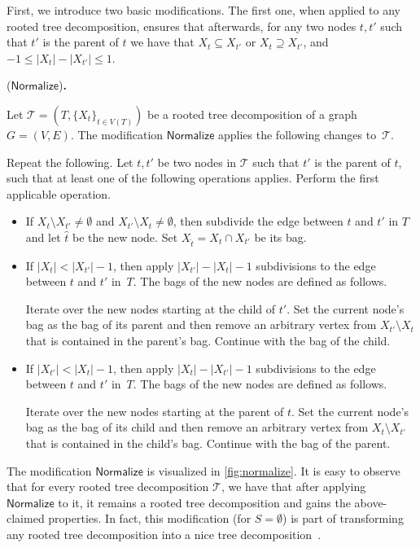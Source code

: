 \documentclass[a4paper,UKenglish,cleveref, autoref, thm-restate, numberwithinsect]{lipics-v2021}
\newcounter{modification}
\newenvironment{modification}[1][]{\refstepcounter{modification}\renewcommand{\arraystretch}{.6}
\begin{center}
\begin{mdframed}[nobreak=true]{\normalsize\sffamily{\bfseries Modification~\themodification} (#1){\bfseries .}}

\vspace{.5ex}
\begin{normalsize}
}
{
\end{normalsize}
\end{mdframed}
\end{center}
}
\newcommand{\Normalize}{\mathsf{Normalize}}
\begin{document}
First, we introduce two basic modifications. The first one, when applied to any rooted tree decomposition, ensures that afterwards, for any two nodes $t,t'$ such that $t'$ is the parent of $t$ we have that $X_t\subseteq X_{t'}$ or $X_t\supseteq X_{t'}$, and $-1\le |X_t|-|X_{t'}|\le 1$. 
\begin{modification}[$\Normalize$]\label{def:normalize}
    Let $\mathcal{T}=(T,\{X_t\}_{t\in V(T)})$ be a rooted tree decomposition of a graph $G=(V,E)$. The modification $\Normalize$ applies the following changes to~$\mathcal{T}$.
    
    Repeat the following. Let $t,t'$ be two nodes in $\mathcal{T}$ such that $t'$ is the parent of $t$, such that 
at least one of the following operations applies. Perform the first applicable operation.
    \begin{itemize}
        \item If $X_t\setminus X_{t'}\neq \emptyset$ and $X_{t'}\setminus X_{t}\neq \emptyset$, then subdivide the edge between $t$ and $t'$ in $T$ and let $\hat{t}$ be the new node. Set $X_{\hat{t}}=X_t\cap X_{t'}$ be its bag.
        \item If $|X_t|<|X_{t'}|-1$, then apply $|X_{t'}|-|X_t|-1$ subdivisions to the edge between $t$ and $t'$ in~$T$. The bags of the new nodes are defined as follows. 
        
        Iterate over the new nodes starting at the child of $t'$. Set the current node's bag as the bag of its parent and then remove an arbitrary vertex from $X_{t'}\setminus X_t$ that is contained in the parent's bag. Continue with the bag of the child.  
        \item If $|X_{t'}|<|X_{t}|-1$, then apply $|X_{t}|-|X_{t'}|-1$ subdivisions to the edge between $t$ and $t'$ in~$T$. The bags of the new nodes are defined as follows. 
        
        Iterate over the new nodes starting at the parent of $t$. Set the current node's bag as the bag of its child and then remove an arbitrary vertex from $X_{t}\setminus X_{t'}$ that is contained in the child's bag. Continue with the bag of the parent.
    \end{itemize}
\end{modification}

The modification $\Normalize$ is visualized in \cref{fig:normalize}. It is easy to observe that for every rooted tree decomposition $\mathcal{T}$, we have that after applying $\Normalize$ to it, it remains a rooted tree decomposition and gains the above-claimed properties. In fact, this modification (for $S=\emptyset$) is part of transforming any rooted tree decomposition into a nice tree decomposition~\cite{bodlaender1996efficient,Die16}. 
\end{document}
